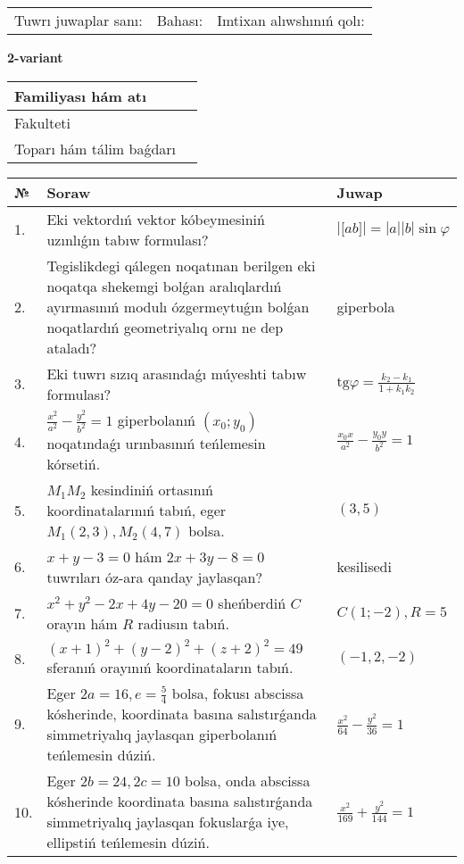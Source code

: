 \documentclass{article}
\begin{document}
\begin{tabular}{lll}
Tuwrı juwaplar sanı: \underline{\hspace{1.5cm}} & 
Bahası: \underline{\hspace{1.5cm}} & 
Imtixan alıwshınıń qolı: \underline{\hspace{2cm}} \\
\end{tabular}

\egroup

\newpage


\textbf{2-variant}\\

\bgroup
\def\arraystretch{1.6} %

\begin{tabular}{|m{5.7cm}|m{9.5cm}|}
\hline
Familiyası hám atı & \\
\hline
Fakulteti  & \\
\hline
Toparı hám tálim baǵdarı  & \\
\hline
\end{tabular}

\vspace{1cm}

\begin{tabular}{|m{0.7cm}|m{10cm}|m{4cm}|}
\hline
№ & Soraw & Juwap \\
\hline
1. & Eki vektordıń vektor kóbeymesiniń uzınlıǵın tabıw formulası? & $\left| \lbrack ab\rbrack \right|=|a||b|\sin\varphi$ \\
\hline
2. & Tegislikdegi qálegen noqatınan berilgen eki noqatqa shekemgi bolǵan aralıqlardıń ayırmasınıń modulı ózgermeytuǵın bolǵan noqatlardıń geometriyalıq ornı ne dep ataladı? & giperbola \\
\hline
3. & Eki tuwrı sızıq arasındaǵı múyeshti tabıw formulası? & $\text{tg}\varphi=\frac{k_2-k_1}{1+k_1k_2}$ \\
\hline
4. & $\frac{x^2}{a^2}-\frac{y^2}{b^2}=1$ giperbolanıń $(x_0;y_0)$ noqatındaǵı urınbasınıń teńlemesin kórsetiń. & $\frac{x_0x}{a^2}-\frac{y_0y}{b^2}=1$ \\
\hline
5. & $M_{1}M_{2}$ kesindiniń ortasınıń koordinatalarınıń tabıń, eger $M_{1} (2, 3), M_{2} (4, 7)$ bolsa. & $(3,5)$ \\
\hline
6. & $x+y-3=0$ hám $2x+3y-8=0$ tuwrıları óz-ara qanday jaylasqan? & kesilisedi \\
\hline
7. & $x^{2}+y^{2}-2x+4y-20=0$ sheńberdiń $C$ orayın hám $R$ radiusın tabıń. & $C(1;-2), R=5$ \\
\hline
8. & $(x+1)^{2}+(y-2) ^{2}+(z+2) ^{2}=49$ sferanıń orayınıń koordinataların tabıń. & $(-1,2,-2)$ \\
\hline
9. & Eger $2a=16, e=\frac{5}{4}$ bolsa, fokusı abscissa kósherinde, koordinata basına salıstırǵanda simmetriyalıq jaylasqan giperbolanıń teńlemesin dúziń. & $\frac{x^{2}}{64}-\frac{y^{2}}{36}=1$ \\
\hline
10. & Eger $2b=24, 2 c=10$ bolsa, onda abscissa kósherinde koordinata basına salıstırǵanda simmetriyalıq jaylasqan fokuslarǵa iye, ellipstiń teńlemesin dúziń. & $\frac{x^{2}}{169}+\frac{y^{2}}{144}=1$ \\
\hline
\end{tabular}
\end{document}
